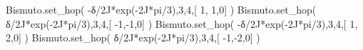 \documentclass[
  letterpaper,
  DIV=11,
  numbers=noendperiod]{scrreprt}
\newenvironment{Shaded}{\begin{snugshade}}{\end{snugshade}}
\newcommand{\DecValTok}[1]{\textcolor[rgb]{0.68,0.00,0.00}{#1}}
\newcommand{\NormalTok}[1]{\textcolor[rgb]{0.00,0.23,0.31}{#1}}
\newcommand{\OperatorTok}[1]{\textcolor[rgb]{0.37,0.37,0.37}{#1}}
\newcommand{\OtherTok}[1]{\textcolor[rgb]{0.00,0.23,0.31}{#1}}
\begin{document}
\begin{Shaded}
\begin{Highlighting}[]
\NormalTok{Bismuto.set\_hop(  }\OperatorTok{{-}}\NormalTok{δ}\OperatorTok{/}\OtherTok{2J}\OperatorTok{*}\NormalTok{exp(}\OperatorTok{{-}}\OtherTok{2J}\OperatorTok{*}\NormalTok{pi}\OperatorTok{/}\DecValTok{3}\NormalTok{),}\DecValTok{3}\NormalTok{,}\DecValTok{4}\NormalTok{,[  }\DecValTok{1}\NormalTok{, }\DecValTok{1}\NormalTok{,}\DecValTok{0}\NormalTok{] ) }
\NormalTok{Bismuto.set\_hop(   δ}\OperatorTok{/}\OtherTok{2J}\OperatorTok{*}\NormalTok{exp(}\OperatorTok{{-}}\OtherTok{2J}\OperatorTok{*}\NormalTok{pi}\OperatorTok{/}\DecValTok{3}\NormalTok{),}\DecValTok{3}\NormalTok{,}\DecValTok{4}\NormalTok{,[ }\OperatorTok{{-}}\DecValTok{1}\NormalTok{,}\OperatorTok{{-}}\DecValTok{1}\NormalTok{,}\DecValTok{0}\NormalTok{] )}
\NormalTok{Bismuto.set\_hop(  }\OperatorTok{{-}}\NormalTok{δ}\OperatorTok{/}\OtherTok{2J}\OperatorTok{*}\NormalTok{exp(}\OperatorTok{{-}}\OtherTok{2J}\OperatorTok{*}\NormalTok{pi}\OperatorTok{/}\DecValTok{3}\NormalTok{),}\DecValTok{3}\NormalTok{,}\DecValTok{4}\NormalTok{,[  }\DecValTok{1}\NormalTok{, }\DecValTok{2}\NormalTok{,}\DecValTok{0}\NormalTok{] )}
\NormalTok{Bismuto.set\_hop(   δ}\OperatorTok{/}\OtherTok{2J}\OperatorTok{*}\NormalTok{exp(}\OperatorTok{{-}}\OtherTok{2J}\OperatorTok{*}\NormalTok{pi}\OperatorTok{/}\DecValTok{3}\NormalTok{),}\DecValTok{3}\NormalTok{,}\DecValTok{4}\NormalTok{,[ }\OperatorTok{{-}}\DecValTok{1}\NormalTok{,}\OperatorTok{{-}}\DecValTok{2}\NormalTok{,}\DecValTok{0}\NormalTok{] )}
\end{Highlighting}
\end{Shaded}
\end{document}
